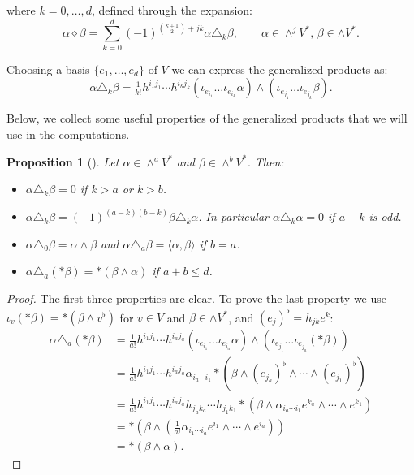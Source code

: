 \documentclass[10pt,a4paper,twoside,reqno]{amsart}
\theoremstyle{plain}
\newtheorem{prop}[thm]{Proposition}
\theoremstyle{definition}
\theoremstyle{remark}
\newcommand{\escal}[1]{\langle#1\rangle}
\begin{document}
\noindent
where $k=0,\ldots,d$, defined through the expansion: 
\begin{equation*}
\alpha\diamond\beta=\sum_{k=0}^d(-1)^{\binom{k+1}{2}+jk}\alpha\triangle_k\beta,\qquad\alpha\in\wedge^j V^*,\,\beta\in\wedge V^*.
\end{equation*}

\noindent
Choosing a basis $\{e_1,\ldots,e_d\}$ of $V$ we can express the generalized products as: 
\begin{equation*}
    \alpha\triangle_k\beta=\tfrac{1}{k!}h^{i_1j_1}\cdots h^{i_kj_k}(\iota_{e_{i_1}}\ldots\iota_{e_{i_k}}\alpha)\wedge(\iota_{e_{j_1}}\ldots\iota_{e_{j_k}}\beta).
\end{equation*}

\noindent
Below, we collect some useful properties of the generalized products that we will use in the computations.

\begin{prop}[{\cite{LB13,LBC13,LBC16}}]\label{prop:appendix_properties}
    Let $\alpha\in\wedge^aV^*$ and $\beta\in\wedge^bV^*$. Then: \begin{itemize}
        \item $\alpha\triangle_k\beta=0$ if $k>a$ or $k>b$.
        \item $\alpha\triangle_k\beta=(-1)^{(a-k)(b-k)}\beta\triangle_k\alpha$. In particular $\alpha\triangle_k\alpha=0$ if $a-k$ is odd.
        \item $\alpha\triangle_0\beta=\alpha\wedge\beta$ and $\alpha\triangle_a\beta=\escal{\alpha,\beta}$ if $b=a$.
        \item $\alpha\triangle_a(*\beta)=*(\beta\wedge\alpha)$ if $a+b\leq d$.
    \end{itemize}
\end{prop}

\begin{proof}
    The first three properties are clear. To prove the last property we use $\iota_v(*\beta)=*(\beta\wedge v^\flat)$ for $v\in V$ and $\beta\in\wedge V^*$, and $(e_j)^\flat=h_{jk}e^k$: \begin{align*}
        \alpha\triangle_a(*\beta)&=\tfrac{1}{a!}h^{i_1j_1}\cdots h^{i_aj_a}(\iota_{e_{i_1}}\ldots\iota_{e_{i_a}}\alpha)\wedge(\iota_{e_{j_1}}\ldots\iota_{e_{j_a}}(*\beta))\\
        &=\tfrac{1}{a!}h^{i_1j_1}\cdots h^{i_aj_a}\alpha_{{i_a}\cdots{i_1}}*(\beta\wedge(e_{j_a})^\flat\wedge\cdots\wedge(e_{j_1})^\flat)\\
        &=\tfrac{1}{a!}h^{i_1j_1}\cdots h^{i_aj_a}h_{j_ak_a}\cdots h_{j_1k_1}*(\beta\wedge\alpha_{{i_a}\cdots{i_1}}e^{k_a}\wedge\cdots\wedge e^{k_1})\\
        &=*(\beta\wedge(\tfrac{1}{a!}\alpha_{{i_1}\cdots{i_a}}e^{i_1}\wedge\cdots\wedge e^{i_a}))\\
        &=*(\beta\wedge\alpha).
    \end{align*}
\end{proof}
\end{document}
